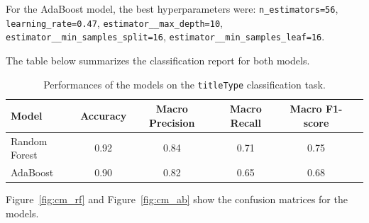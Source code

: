 

For the AdaBoost model, the best hyperparameters were:
\texttt{n\_estimators=56}, \texttt{learning\_rate=0.47},
\texttt{estimator\_\_max\_depth=10},
\texttt{estimator\_\_min\_samples\_split=16},
\texttt{estimator\_\_min\_samples\_leaf=16}.


The table below summarizes the classification report for both models.
\begin{table}[H]
    \centering
    \label{tab:classification_report}
    \begin{tabular}{lccccc}
    \hline
    \textbf{Model} & \textbf{Accuracy} & \textbf{Macro Precision} & \textbf{Macro Recall} & \textbf{Macro F1-score} \\
    \hline
    Random Forest & 0.92 & 0.84 & 0.71 & 0.75 \\
    AdaBoost & 0.90 & 0.82 & 0.65 & 0.68 \\
    \hline
    \end{tabular}
    \caption{Performances of the models on the \texttt{titleType} classification task.}
\end{table}

Figure~\ref{fig:cm_rf} and Figure~\ref{fig:cm_ab} show the confusion matrices
for the models.

